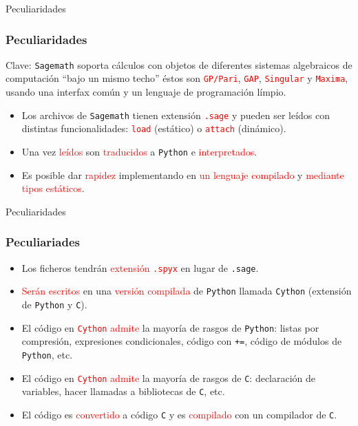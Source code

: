 \documentclass[dvipsnames]{beamer}
\begin{document}
\begin{frame}[fragile]{Peculiaridades}
  \frametitle{Peculiaridades}
  \begin{block}{Clave: \texttt{Sagemath} soporta cálculos con objetos
      de diferentes sistemas algebraicos de computación ``bajo un
      mismo techo''}
    éstos son \textcolor{red}{\texttt{GP/Pari}},
    \textcolor{red}{\texttt{GAP}}, \textcolor{red}{\texttt{Singular}}
    y \textcolor{red}{\texttt{Maxima}}, usando una interfax común y un
    lenguaje de programación límpio.
  \end{block}\pause 
  \begin{itemize}[<+->]
  \item Los archivos de \texttt{Sagemath} tienen extensión
    \textcolor{red}{\texttt{.sage}} y pueden ser leídos con distintas
    funcionalidades: \textcolor{red}{\texttt{load}} (\textcolor{OliveGreen}{estático}) o
    \textcolor{red}{\texttt{attach}} (\textcolor{OliveGreen}{dinámico}).
  \item Una vez \textcolor{red}{leídos} son
    \textcolor{red}{traducidos} a \texttt{Python} e
    \textcolor{red}{interpretados}.
  \item Es posible dar \textcolor{red}{rapidez} implementando en
    \textcolor{red}{un lenguaje compilado} y \textcolor{red}{mediante
      tipos estáticos}.
  \end{itemize}
\end{frame}

\begin{frame}[fragile]{Peculiaridades}
  \frametitle{Peculiariades}
  \begin{itemize}[<+->]
  \item Los ficheros tendrán \textcolor{red}{extensión \texttt{.spyx}}
    en lugar de \texttt{.sage}.
  \item \textcolor{red}{Serán escritos} en una \textcolor{red}{versión
      compilada} de \texttt{Python} llamada \texttt{Cython} (extensión
    de \texttt{Python} y \texttt{C}).
  \item El código en \textcolor{red}{\texttt{Cython} admite} la mayoría de rasgos de
    \texttt{Python}: listas por compresión, expresiones condicionales,
    código con \texttt{+=}, código de módulos de \texttt{Python}, etc.
  \item El código en \textcolor{red}{\texttt{Cython} admite} la
    mayoría de rasgos de \texttt{C}: declaración de variables, hacer
    llamadas a bibliotecas de \texttt{C}, etc.
  \item El código es \textcolor{red}{convertido} a código \texttt{C} y
    es \textcolor{red}{compilado} con un compilador de \texttt{C}.
  \end{itemize}
\end{frame}
\end{document}
